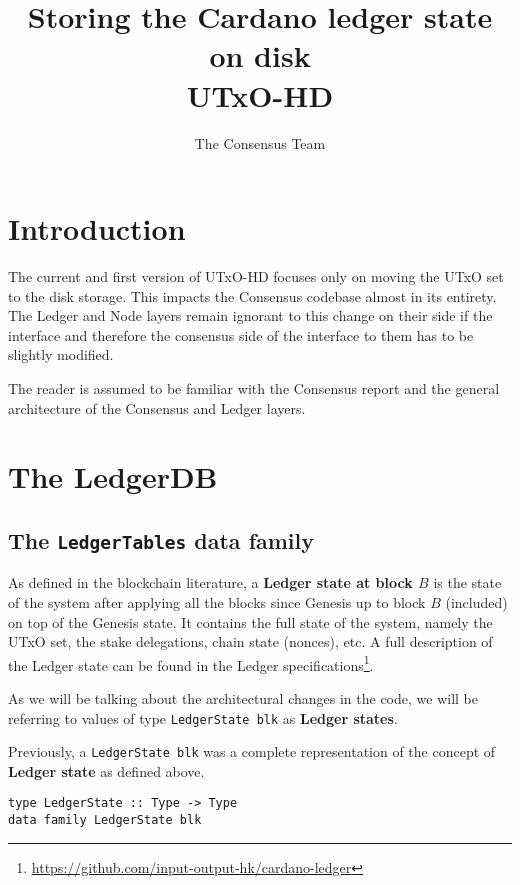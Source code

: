 \documentclass[11pt,a4paper]{article}
\title{Storing the Cardano ledger state on disk\\
       {\large \sc UTxO-HD}
  }
\author{The Consensus Team
  }
\theoremstyle{definition}
\begin{document}
\maketitle

\tableofcontents

\section{Introduction}

The current and first version of UTxO-HD focuses only on moving the UTxO set to
the disk storage. This impacts the Consensus codebase almost in its entirety.
The Ledger and Node layers remain ignorant to this change on their side if the
interface and therefore the consensus side of the interface to them has to be
slightly modified.

The reader is assumed to be familiar with the Consensus report and the general
architecture of the Consensus and Ledger layers.

\section{The LedgerDB}

\subsection{The \texttt{LedgerTables} data family}

As defined in the blockchain literature, a \textbf{Ledger state at block $B$} is
the state of the system after applying all the blocks since Genesis up to block
$B$ (included) on top of the Genesis state. It contains the full state of the
system, namely the UTxO set, the stake delegations, chain state (nonces), etc. A
full description of the Ledger state can be found in the Ledger
specifications\footnote{\href{https://github.com/input-output-hk/cardano-ledger}{https://github.com/input-output-hk/cardano-ledger}}.

As we will be talking about the architectural changes in the code, we will be referring to values of type \texttt{LedgerState blk} as \textbf{Ledger states}.

Previously, a \texttt{LedgerState blk} was a complete representation of the
concept of \textbf{Ledger state} as defined above.

\begin{lstlisting}
type LedgerState :: Type -> Type
data family LedgerState blk
\end{lstlisting}
\end{document}
